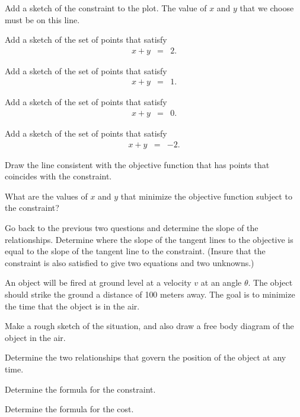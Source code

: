 \begin{problem}
  \vspace{-1em}
  \scalebox{0.55}{}

  \begin{subproblem}
    \item Add a sketch of the constraint to the plot. The value of $x$
      and $y$ that we choose must be on this line.
    \item Add a sketch of the set of points that satisfy
      \begin{eqnarray*}
        x + y & = & 2.
      \end{eqnarray*}
    \item Add a sketch of the set of points that satisfy
      \begin{eqnarray*}
        x + y & = & 1.
      \end{eqnarray*}
    \item Add a sketch of the set of points that satisfy
      \begin{eqnarray*}
        x + y & = & 0.
      \end{eqnarray*}
    \item Add a sketch of the set of points that satisfy
      \begin{eqnarray*}
        x + y & = & -2.
      \end{eqnarray*}
    \item Draw the line consistent with the objective function that
      has points that coincides with the constraint.
    \item What are the values of $x$ and $y$ that minimize the
      objective function subject to the constraint?
  \end{subproblem}

  \clearpage

\item Go back to the previous two questions and determine the slope of
  the relationships. Determine where the slope of the tangent lines to
  the objective is equal to the slope of the tangent line to the
  constraint. (Insure that the constraint is also satisfied to give
  two equations and two unknowns.)

  \hfill

  \clearpage

\item An object will be fired at ground level at a velocity $v$ at an
  angle $\theta$. The object should strike the ground a distance of
  100 meters away. The goal is to minimize the time that the object is
  in the air.
  \begin{subproblem}
  \item Make a rough sketch of the situation, and also draw a free
    body diagram of the object in the air.
    \vfill
  \item Determine the two relationships that govern the position of
    the object at any time.
    \vfill
  \item Determine the formula for the constraint.
    \vfill
  \item Determine the formula for the cost.
    \vfill


\end{subproblem}
\end{problem}
